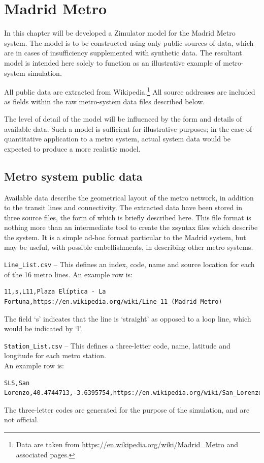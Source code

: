 \section{Madrid Metro}
\label{Madrid}

In this chapter will be developed a Zimulator model for the Madrid
Metro system.  The model is to be constructed using only public
sources of data, which are in cases of insufficiency supplemented with
synthetic data.  The resultant model is intended here solely to
function as an illustrative example of metro-system simulation.

All public data are extracted from Wikipedia.\footnote{Data are taken from \href{https://en.wikipedia.org/wiki/Madrid_Metro}{https://en.wikipedia.org/wiki/Madrid\_Metro} and associated pages.} All source addresses are included
as fields within the raw metro-system data files described below.

The level of detail of the model will be influenced by the form and
details of available data. Such a model is sufficient for illustrative
purposes; in the case of quantitative application to a metro system,
actual system data would be expected to produce a more realistic model.

\subsection{Metro system public data}

Available data describe the geometrical layout of the metro network,
in addition to the transit lines and connectivity. The extracted data
have been stored in three source files, the form of which is briefly
described here. This file format is nothing more than an intermediate
tool to create the zsyntax files which describe the system. It is a
simple ad-hoc format particular to the Madrid system, but may be
useful, with possible embellishments, in describing other metro
systems.

{\tt Line\_List.csv} -- This defines an index, code, name and source location for each of the 16 metro lines. 
An example row is: 
\begin{lstlisting}[mathescape]
  11,s,L11,Plaza Elíptica - La Fortuna,https://en.wikipedia.org/wiki/Line_11_(Madrid_Metro)
\end{lstlisting}
The field `s' indicates that the line is `straight' as opposed to a loop line, which would be indicated by `l'.

{\tt Station\_List.csv} -- This defines a three-letter code, name, latitude and longitude for each metro station. \\
An example row is:
\begin{lstlisting}[mathescape]
 SLS,San Lorenzo,40.4744713,-3.6395754,https://en.wikipedia.org/wiki/San_Lorenzo_(Madrid_Metro)
\end{lstlisting}  
The three-letter codes are generated for the purpose of the simulation, and are not official.

